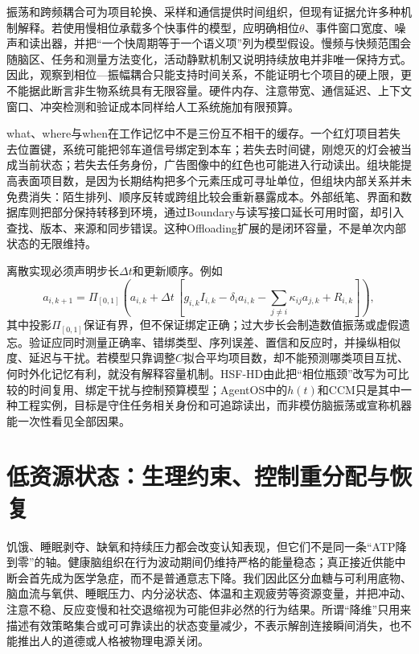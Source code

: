 振荡和跨频耦合可为项目轮换、采样和通信提供时间组织，但现有证据允许多种机制解释。若使用慢相位承载多个快事件的模型，应明确相位$\theta$、事件窗口宽度、噪声和读出器，并把“一个快周期等于一个语义项”列为模型假设。慢频与快频范围会随脑区、任务和测量方法变化，活动静默机制又说明持续放电并非唯一保持方式。因此，观察到相位—振幅耦合只能支持时间关系，不能证明七个项目的硬上限，更不能据此断言非生物系统具有无限容量。硬件内存、注意带宽、通信延迟、上下文窗口、冲突检测和验证成本同样给人工系统施加有限预算。

what、where与when在工作记忆中不是三份互不相干的缓存。一个红灯项目若失去位置键，系统可能把邻车道信号绑定到本车；若失去时间键，刚熄灭的灯会被当成当前状态；若失去任务身份，广告图像中的红色也可能进入行动读出。组块能提高表面项目数，是因为长期结构把多个元素压成可寻址单位，但组块内部关系并未免费消失：陌生排列、顺序反转或跨组比较会重新暴露成本。外部纸笔、界面和数据库则把部分保持转移到环境，通过Boundary与读写接口延长可用时窗，却引入查找、版本、来源和同步错误。这种Offloading扩展的是闭环容量，不是单次内部状态的无限维持。

离散实现必须声明步长$\Delta t$和更新顺序。例如
\begin{equation}
 a_{i,k+1}=\Pi_{[0,1]}\!\left(a_{i,k}+\Delta t\,[g_{i,k}I_{i,k}-\delta_i a_{i,k}-\textstyle\sum_{j\ne i}\kappa_{ij}a_{j,k}+R_{i,k}]\right),
\end{equation}
其中投影$\Pi_{[0,1]}$保证有界，但不保证绑定正确；过大步长会制造数值振荡或虚假遗忘。验证应同时测量正确率、错绑类型、序列误差、置信和反应时，并操纵相似度、延迟与干扰。若模型只靠调整$C$拟合平均项目数，却不能预测哪类项目互扰、何时外化记忆有利，就没有解释容量机制。HSF-HD由此把“相位瓶颈”改写为可比较的时间复用、绑定干扰与控制预算模型；AgentOS中的$h(t)$和CCM只是其中一种工程实例，目标是守住任务相关身份和可追踪读出，而非模仿脑振荡或宣称机器能一次性看见全部因果。

\section{低资源状态：生理约束、控制重分配与恢复}
\label{sec:thermodynamic_depletion_and_dimensional_collapse}

饥饿、睡眠剥夺、缺氧和持续压力都会改变认知表现，但它们不是同一条“ATP降到零”的轴。健康脑组织在行为波动期间仍维持严格的能量稳态；真正接近供能中断会首先成为医学急症，而不是普通意志下降。我们因此区分血糖与可利用底物、脑血流与氧供、睡眠压力、内分泌状态、体温和主观疲劳等资源变量，并把冲动、注意不稳、反应变慢和社交退缩视为可能但非必然的行为结果。所谓“降维”只用来描述有效策略集合或可可靠读出的状态变量减少，不表示解剖连接瞬间消失，也不能推出人的道德或人格被物理电源关闭。

